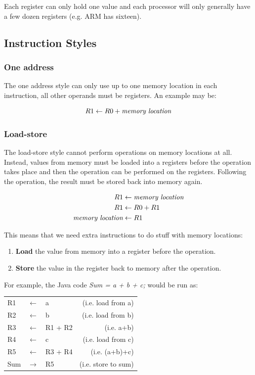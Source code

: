 \documentclass{article}
\begin{document}
Each register can only hold one value and each processor will only generally have a few dozen registers (e.g. ARM has sixteen).

\subsection{Instruction Styles}

\subsubsection{One address}
The one address style can only use up to one memory location in each instruction, all other operands must be registers. An example may be:

\[
    R1 \leftarrow R0 + \textrm{\it memory location}
\]

\subsubsection{Load-store}
The load-store style cannot perform operations on memory locations at all. Instead, values from memory must be loaded into a registers before the operation takes place and then the operation can be performed on the registers. Following the operation, the result must be stored back into memory again.

\[
	\begin{split}
	    R1 &\leftarrow \textrm{\it memory location}\\
		R1 &\leftarrow R0 + R1\\
	    \textrm{\it memory location} &\leftarrow R1
    \end{split}
\]

This means that we need extra instructions to do stuff with memory locations:
\begin{enumerate}
	\item \textbf{Load} the value from memory into a register before the operation.
	\item \textbf{Store} the value in the register back to memory after the operation.
\end{enumerate}

For example, the Java code {\it Sum = a + b + c;} would be run as:

\begin{center}
    \begin{tabular}{l l l r}
        R1 & $\leftarrow$ & a & (i.e. load from a)\\
        R2 & $\leftarrow$ & b & (i.e. load from b)\\
        R3 & $\leftarrow$ & R1 + R2 & (i.e. a+b)\\
        R4 & $\leftarrow$ & c & (i.e. load from c)\\
        R5 & $\leftarrow$ & R3 + R4  & (i.e. (a+b)+c)\\
        Sum & $\rightarrow$ & R5 & (i.e. store to sum)\\
    \end{tabular}
\end{center}
\end{document}
